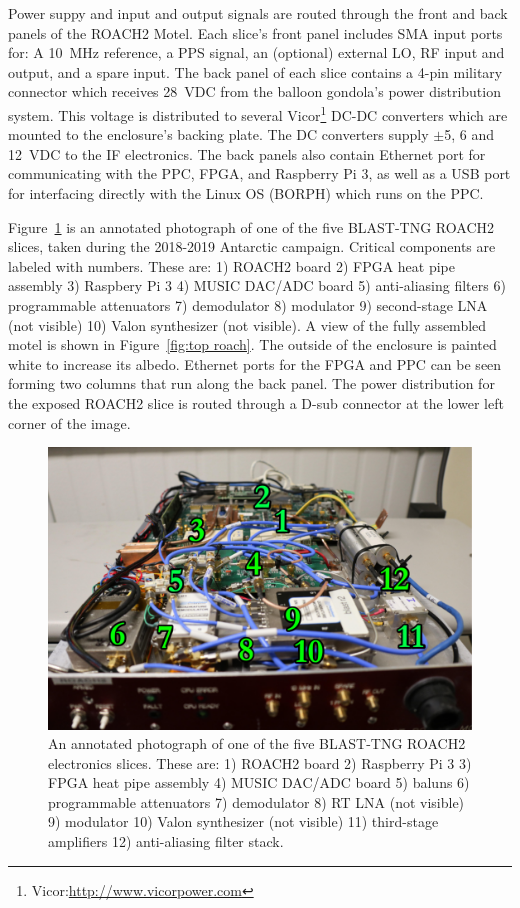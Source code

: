 Power suppy and input and output signals are routed through the front and back panels of the ROACH2 Motel. Each slice's front panel includes SMA input ports for: A 10~MHz reference, a PPS signal, an (optional) external LO, RF input and output, and a spare input. The back panel of each slice contains a 4-pin military connector which receives 28~VDC from the balloon gondola’s power distribution system. This voltage is distributed to several Vicor\footnote{Vicor:\url{http://www.vicorpower.com}} DC-DC converters which are mounted to the enclosure's backing plate. The DC converters supply $\pm$5, 6 and 12~VDC to the IF electronics. The back panels also contain Ethernet port for communicating with the PPC, FPGA, and Raspberry Pi 3, as well as a USB port for interfacing directly with the Linux OS (BORPH) which runs on the PPC.

Figure~\ref{fig:if slice} is an annotated photograph of one of the five BLAST-TNG ROACH2 slices, taken during the 2018-2019 Antarctic campaign. Critical components are labeled with numbers. These are: 1) ROACH2 board 2) FPGA heat pipe assembly 3) Raspbery Pi 3 4) MUSIC DAC/ADC board 5) anti-aliasing filters 6) programmable attenuators 7) demodulator 8) modulator 9) second-stage LNA (not visible) 10) Valon synthesizer (not visible). A view of the fully assembled motel is shown in Figure~\ref{fig:top roach}. The outside of the enclosure is painted white to increase its albedo. Ethernet ports for the FPGA and PPC can be seen forming two columns that run along the back panel. The power distribution for the exposed ROACH2 slice is routed through a D-sub connector at the lower left corner of the image.

\begin{figure}
\centering
\includegraphics[width=\textwidth]{figures/readout/hardware/roach_slice_annotated}
\caption[~An annotated photograph of one of the five BLAST-TNG ROACH2 electronics slices.]{An annotated photograph of one of the five BLAST-TNG ROACH2 electronics slices. These are: 1) ROACH2 board 2) Raspberry Pi 3 3) FPGA heat pipe assembly 4) MUSIC DAC/ADC board 5) baluns 6) programmable attenuators 7) demodulator 8) RT LNA (not visible) 9) modulator 10) Valon synthesizer (not visible) 11) third-stage amplifiers 12) anti-aliasing filter stack.}
\label{fig:if slice}
\end{figure}

